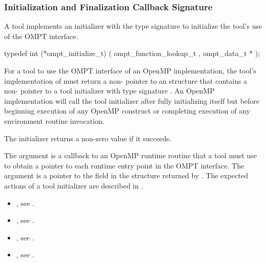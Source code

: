 \subsubsection{Initialization and Finalization Callback Signature}

\label{sec:ompt_initialize_t}

\summary
A tool implements an initializer with the type signature
 to initialize the tool's use of
the OMPT interface.

\format

\begin{ccppspecific}
\begin{omptInquiry}
typedef int (*ompt_initialize_t) (
  ompt_function_lookup_t ,
  ompt_data_t *
);
\end{omptInquiry}
\end{ccppspecific}


\descr
For a tool to use the OMPT interface of an OpenMP implementation,
the tool's implementation of  must return a 
non- pointer to an
 structure that contains a
non- pointer to a tool initializer with
type signature .
An OpenMP implementation will call the tool initializer
after fully initializing itself but before
beginning execution of any OpenMP construct
or completing execution of any environment routine invocation.  

The initializer returns a non-zero value if it succeeds.

\argdesc
The argument  is a callback 
to an OpenMP runtime routine that a tool must use to 
obtain a pointer to each runtime entry point in the OMPT interface.
The argument  is a pointer to the
 field in the 
structure returned by .
The expected actions of a tool initializer are described in
.

\crossreferences
\begin{itemize}
\item {}, see
  .
\item {}, see .
\item {}, see .
\item {}, see
  .
\end{itemize}


